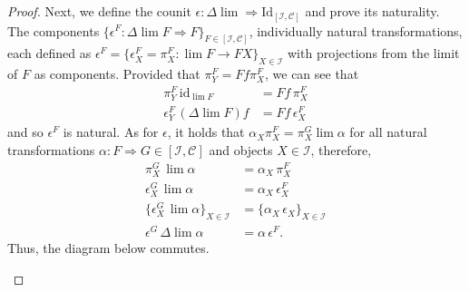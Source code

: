 \documentclass[ 12pt ]{article}
\begin{document}
\begin{enumerate}
\begin{proof}
			Next, we define the counit $\epsilon : \Delta \lim \Rightarrow \mathrm{Id}_{[\mathscr{I}, \mathscr{C}]}$ and prove its naturality. The components $\{ \epsilon^F : \Delta \lim F \Rightarrow F \}_{F \in [\mathscr{I}, \mathscr{C}]}$, individually natural transformations, each defined as $\epsilon^F = \{ \epsilon_X^F = \pi_X^F : \lim F \to FX \}_{X \in \mathscr{I}}$ with projections from the limit of $F$ as components. Provided that $\pi_Y^F = Ff \pi_X^F$, we can see that
			\begin{align*}
				\pi_Y^F\, \mathrm{id}_{\lim F} &= Ff\, \pi_X^F \\
				\epsilon_Y^F\, (\Delta \lim F) f &= Ff\, \epsilon_X^F
			\end{align*}
			and so $\epsilon^F$ is natural. As for $\epsilon$, it holds that $\alpha_X \pi_X^F = \pi_X^G \lim \alpha$ for all natural transformations $\alpha : F \Rightarrow G \in [\mathscr{I}, \mathscr{C}]$ and objects $X \in \mathscr{I}$, therefore,
			\begin{align*}
				\pi_X^G\, \lim \alpha &= \alpha_X\, \pi_X^F \\
				\epsilon_X^G\, \lim \alpha &= \alpha_X\, \epsilon_X^F \\
				\{ \epsilon_X^G\, \lim \alpha \}_{X \in \mathscr{I}} &= \{ \alpha_X\, \epsilon_X \}_{X \in \mathscr{I}} \\
				\epsilon^G\, \Delta \lim \alpha &= \alpha\, \epsilon^F.
			\end{align*}
			Thus, the diagram below commutes.
			\begin{center}
			\end{center}
			$ $ \\


\end{proof}
\end{enumerate}
\end{document}
